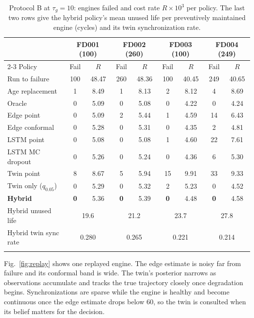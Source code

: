 \documentclass[pdflatex,sn-mathphys-num]{sn-jnl}
\begin{document}
\begin{table}[t]
\caption{Protocol B at $\tau_g = 10$: engines failed and cost rate $R\times 10^3$ per policy. The last two rows give the hybrid policy's mean unused life per preventively maintained engine (cycles) and its twin synchronization rate.}\label{tab:decisions}
\begin{tabular*}{\textwidth}{@{\extracolsep\fill}lcccccccc}
\toprule
& \multicolumn{2}{c}{FD001 (100)} & \multicolumn{2}{c}{FD002 (260)} & \multicolumn{2}{c}{FD003 (100)} & \multicolumn{2}{c}{FD004 (249)} \\
\cmidrule{2-3}\cmidrule{4-5}\cmidrule{6-7}\cmidrule{8-9}
Policy & Fail & $R$ & Fail & $R$ & Fail & $R$ & Fail & $R$ \\
\midrule
Run to failure      & 100 & 48.47 & 260 & 48.36 & 100 & 40.45 & 249 & 40.65 \\
Age replacement     & 1 & 8.49 & 1 & 8.13 & 2 & 8.12 & 4 & 8.69 \\
Oracle              & 0 & 5.09 & 0 & 5.08 & 0 & 4.22 & 0 & 4.24 \\
\midrule
Edge point          & 0 & 5.09 & 2 & 5.44 & 1 & 4.59 & 14 & 6.43 \\
Edge conformal      & 0 & 5.28 & 0 & 5.31 & 0 & 4.35 & 2 & 4.81 \\
LSTM point          & 0 & 5.08 & 0 & 5.08 & 1 & 4.60 & 22 & 7.61 \\
LSTM MC dropout     & 0 & 5.26 & 0 & 5.24 & 0 & 4.36 & 6 & 5.30 \\
Twin point          & 8 & 8.67 & 5 & 5.94 & 15 & 9.91 & 33 & 9.33 \\
Twin only ($q_{0.05}$) & 0 & 5.29 & 0 & 5.32 & 2 & 5.23 & 0 & 4.52 \\
\textbf{Hybrid}     & \textbf{0} & 5.36 & \textbf{0} & 5.39 & \textbf{0} & 4.48 & \textbf{0} & 4.58 \\
\midrule
Hybrid unused life & \multicolumn{2}{c}{19.6} & \multicolumn{2}{c}{21.2} & \multicolumn{2}{c}{23.7} & \multicolumn{2}{c}{27.8} \\
Hybrid twin sync rate & \multicolumn{2}{c}{0.280} & \multicolumn{2}{c}{0.265} & \multicolumn{2}{c}{0.221} & \multicolumn{2}{c}{0.214} \\
\botrule
\end{tabular*}
\end{table}

Fig.~\ref{fig:replay} shows one replayed engine. The edge estimate is noisy far from failure and its conformal band is wide. The twin's posterior narrows as observations accumulate and tracks the true trajectory closely once degradation begins. Synchronizations are sparse while the engine is healthy and become continuous once the edge estimate drops below 60, so the twin is consulted when its belief matters for the decision.
\end{document}
